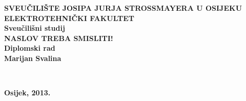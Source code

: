 \newpage
\begin{titlepage}
\begin{center}
\newcommand{\HRule}[1]{\rule{\linewidth}{#1}}

\textbf{\MakeUppercase{\large Sveučilište Josipa Jurja Strossmayera u Osijeku}}\\[0.2cm]
\textbf{\MakeUppercase{\large Elektrotehnički fakultet}}\\[0.8cm]
\textbf{\large Sveučilišni studij}\\ [5cm]


\textbf{\MakeUppercase{\Large Naslov treba smisliti!}}\\ [1cm]
\textbf{\large Diplomski rad}\\  [5 cm] 

\textbf{\Large Marijan Svalina}\\ [0.5cm] 



\vfill
\begin{minipage}{0.4\textwidth}
\begin{flushleft} \large

\textsc\\

\end{flushleft}
\end{minipage}

\begin{minipage}{0.4\textwidth}

\begin{center} \large
\textbf{\large Osijek, 2013.} \\

\end{center}


\end{minipage}
\end{center}
\end{titlepage}
